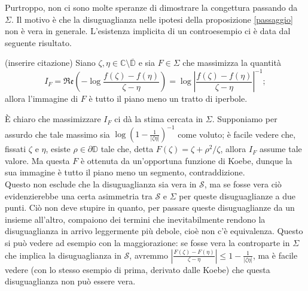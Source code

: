 Purtroppo, non ci sono molte speranze di dimostrare la congettura passando da $\Sigma$. Il motivo è che la disuguaglianza nelle ipotesi della proposizione \ref{passaggio} non è vera in generale. L'esistenza implicita di un controesempio ci è data dal seguente risultato.

\begin{thm}
  (inserire citazione) Siano $\zeta, \eta \in \mathbb{C}\setminus\overline{\mathbb{D}}$ e sia $F \in \Sigma$ che massimizza la quantità
  $$I_F=\mathfrak{Re}\left(-\log\frac{f(\zeta)-f(\eta)}{\zeta-\eta}\right)=\log\left|\frac{f(\zeta)-f(\eta)}{\zeta-\eta}\right|^{-1};$$
  allora l'immagine di $F$ è tutto il piano meno un tratto di iperbole.
\end{thm}

È chiaro che massimizzare $I_F$ ci dà la stima cercata in $\Sigma$. Supponiamo per assurdo che tale massimo sia $\log\left(1-\frac{1}{|\zeta\eta|}\right)^{-1}$ come voluto; è facile vedere che, fissati $\zeta$ e $\eta$, esiste $\rho \in \partial\mathbb{D}$ tale che, detta $F(\zeta)=\zeta+\rho^2/\zeta$, allora $I_F$ assume tale valore. Ma questa $F$ è ottenuta da un'opportuna funzione di Koebe, dunque la sua immagine è tutto il piano meno un segmento, contraddizione. \\

Questo non esclude che la disuguaglianza sia vera in $\mathcal{S}$, ma se fosse vera ciò evidenzierebbe una certa asimmetria tra $\mathcal{S}$ e $\Sigma$ per queste disuguaglianze a due punti. Ciò non deve stupire in quanto, per passare queste disuguaglianze da un insieme all'altro, compaiono dei termini che inevitabilmente rendono la disuguaglianza in arrivo leggermente più debole, cioè non c'è equivalenza. Questo si può vedere ad esempio con la maggiorazione: se fosse vera la controparte in $\Sigma$ che implica la disuguaglianza in $\mathcal{S}$, avremmo $\left|\frac{F(\zeta)-F(\eta)}{\zeta-\eta}\right| \le 1-\frac{1}{|\zeta\eta|}$, ma è facile vedere (con lo stesso esempio di prima, derivato dalle Koebe) che questa disuguaglianza non può essere vera.
